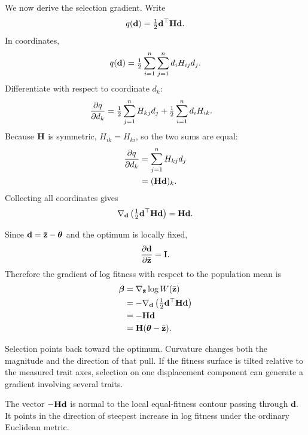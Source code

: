 We now derive the selection gradient. Write
\begin{equation}
q(\mathbf d)=\tfrac12\mathbf d^\top\mathbf{H}\mathbf d.
\end{equation}
In coordinates,
\begin{equation}
q(\mathbf d)=\tfrac12\sum_{i=1}^n\sum_{j=1}^n d_iH_{ij}d_j.
\end{equation}
Differentiate with respect to coordinate \(d_k\):
\begin{align}
\frac{\partial q}{\partial d_k}
&=\tfrac12\sum_{j=1}^n H_{kj}d_j
+\tfrac12\sum_{i=1}^n d_iH_{ik}.
\end{align}
Because \(\mathbf{H}\) is symmetric, \(H_{ik}=H_{ki}\), so the two sums are equal:
\begin{align}
\frac{\partial q}{\partial d_k}
&=\sum_{j=1}^nH_{kj}d_j\\
&=(\mathbf{H}\mathbf d)_k.
\end{align}
Collecting all coordinates gives
\begin{equation}
\nabla_{\mathbf d}\left(\tfrac12\mathbf d^\top\mathbf{H}\mathbf d\right)
=\mathbf{H}\mathbf d.
\label{eq:quadraticGradientIdentity}
\end{equation}

Since \(\mathbf d=\bar{\mathbf z}-\boldsymbol{\theta}\) and the optimum is locally fixed,
\begin{equation}
\frac{\partial\mathbf d}{\partial\bar{\mathbf z}}=\mathbf{I}.
\end{equation}
Therefore the gradient of log fitness with respect to the population mean is
\begin{align}
\boldsymbol{\beta}
&=\nabla_{\bar{\mathbf z}}\log W(\bar{\mathbf z})\\
&=-\nabla_{\mathbf d}\left(\tfrac12\mathbf d^\top\mathbf{H}\mathbf d\right)\\
&=-\mathbf{H}\mathbf d\\
&=\mathbf{H}(\boldsymbol{\theta}-\bar{\mathbf z}).
\label{eq:selectionGradient}
\end{align}

\inwords Selection points back toward the optimum. Curvature changes both the magnitude and the direction of that pull. If the fitness surface is tilted relative to the measured trait axes, selection on one displacement component can generate a gradient involving several traits.

\begin{geombox}
The vector \(-\mathbf{H}\mathbf d\) is normal to the local equal-fitness contour passing through \(\mathbf d\). It points in the direction of steepest increase in log fitness under the ordinary Euclidean metric.
\end{geombox}

